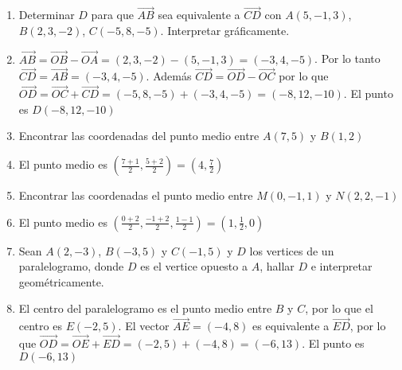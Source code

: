 \documentclass[a4paper]{article}
\newcommand{\answer}{\item[**]}
\newcommand{\df}[2]{\displaystyle\frac{#1}{#2}}
\newcommand{\vect}[1]{\overrightarrow{#1}}
\begin{document}
\begin{enumerate}
\begin{enumerate} [label=(\alph*)]
		\item Determinar $D$ para que $\vect{AB}$ sea equivalente a $\vect{CD}$ con $A(5,-1,3)$, $B(2,3,-2)$, $C(-5,8,-5)$. Interpretar gráficamente.
		\answer $\vect{AB} = \vect{OB} - \vect{OA} = (2,3,-2) - (5,-1,3) = (-3,4,-5)$. Por lo tanto $\vect{CD} = \vect{AB} = (-3,4,-5)$. Además $ \vect{CD}= \vect{OD} - \vect{OC}$ por lo que $\vect{OD} = \vect{OC} + \vect{CD} = (-5,8,-5) + (-3,4,-5) = (-8,12,-10)$. El punto es $D(-8,12,-10)$

		\item Encontrar las coordenadas del punto medio entre $A(7,5)$ y $B(1,2)$
		\answer El punto medio es $\left(\df{7+1}{2}, \df{5+2}{2}\right) = \left(4,\df{7}{2}\right)$

		\item Encontrar las coordenadas el punto medio entre $M(0,-1,1)$ y $N(2,2,-1)$
		\answer El punto medio es $\left(\df{0+2}{2}, \df{-1+2}{2}, \df{1-1}{2}\right) = \left(1,\df{1}{2},0\right)$

		\item Sean $A(2,-3)$, $B(-3,5)$ y $C(-1,5)$ y $D$ los vertices de un paralelogramo, donde $D$ es el vertice opuesto a $A$, hallar $D$ e interpretar geométricamente.
		\answer El centro del paralelogramo es el punto medio entre $B$ y $C$, por lo que el centro es $E(-2,5)$. El vector $\vect{AE}=(-4,8)$ es equivalente a $\vect{ED}$, por lo que $\vect{OD} = \vect{OE} + \vect{ED} = (-2,5) + (-4,8) = (-6,13)$. El punto es $D(-6,13)$

	\end{enumerate}



\end{enumerate}
\end{document}
